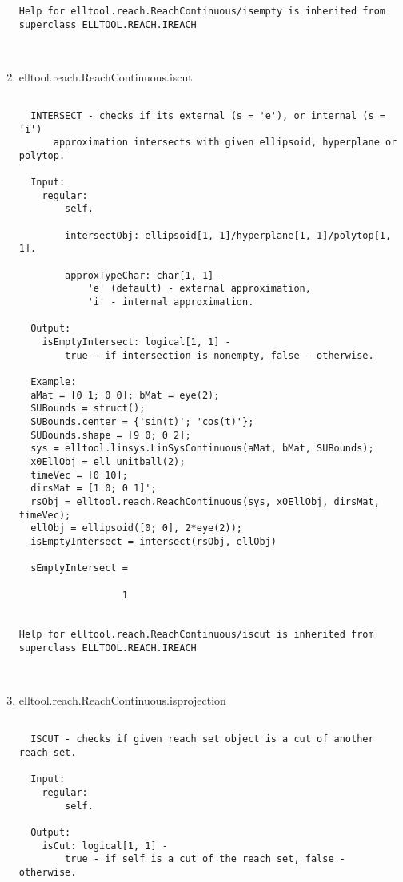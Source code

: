 \begin{enumerate}
\begin{lstlisting}
Help for elltool.reach.ReachContinuous/isempty is inherited from superclass ELLTOOL.REACH.IREACH



\end{lstlisting}
\fontfamily{\familydefault}
\selectfont
\item {elltool.reach.ReachContinuous.iscut}
\selectfont
\begin{lstlisting}

  INTERSECT - checks if its external (s = 'e'), or internal (s = 'i')
      approximation intersects with given ellipsoid, hyperplane or polytop.

  Input:
    regular:
        self.

        intersectObj: ellipsoid[1, 1]/hyperplane[1, 1]/polytop[1, 1].

        approxTypeChar: char[1, 1] -
            'e' (default) - external approximation,
            'i' - internal approximation.

  Output:
    isEmptyIntersect: logical[1, 1] -
        true - if intersection is nonempty, false - otherwise.

  Example:
  aMat = [0 1; 0 0]; bMat = eye(2);
  SUBounds = struct();
  SUBounds.center = {'sin(t)'; 'cos(t)'};
  SUBounds.shape = [9 0; 0 2];
  sys = elltool.linsys.LinSysContinuous(aMat, bMat, SUBounds);
  x0EllObj = ell_unitball(2);
  timeVec = [0 10];
  dirsMat = [1 0; 0 1]';
  rsObj = elltool.reach.ReachContinuous(sys, x0EllObj, dirsMat, timeVec);
  ellObj = ellipsoid([0; 0], 2*eye(2));
  isEmptyIntersect = intersect(rsObj, ellObj)

  sEmptyIntersect =

                  1


Help for elltool.reach.ReachContinuous/iscut is inherited from superclass ELLTOOL.REACH.IREACH



\end{lstlisting}
\fontfamily{\familydefault}
\selectfont
\item {elltool.reach.ReachContinuous.isprojection}
\selectfont
\begin{lstlisting}

  ISCUT - checks if given reach set object is a cut of another reach set.

  Input:
    regular:
        self.

  Output:
    isCut: logical[1, 1] -
        true - if self is a cut of the reach set, false - otherwise.


\end{lstlisting}
\end{enumerate}
